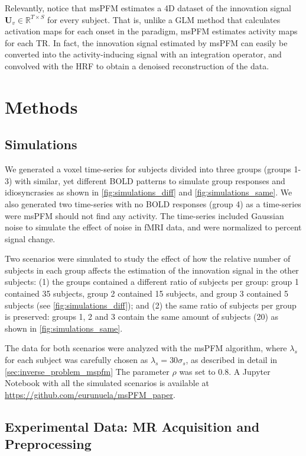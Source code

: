 Relevantly, notice that msPFM estimates a 4D dataset of the innovation signal
$\mathbf{U}_v \in \mathbb{R}^{T \times S}$ for every subject. That is, unlike a
GLM method that calculates activation maps for each onset in the paradigm, msPFM
estimates activity maps for each TR. In fact, the innovation signal estimated by
msPFM can easily be converted into the activity-inducing signal with an
integration operator, and convolved with the HRF to obtain a denoised
reconstruction of the data.

\section{Methods}
\label{sec:multi_subject_methods}

\subsection{Simulations}\label{Data}

We generated a voxel time-series for subjects divided into three groups (groups
1-3) with similar, yet different BOLD patterns to simulate group responses and
idiosyncrasies as shown in \cref{fig:simulations_diff} and
\cref{fig:simulations_same}. We also generated two time-series with no BOLD
responses (group 4) as a time-series were msPFM should not find any activity.
The time-series included Gaussian noise to simulate the effect of noise in fMRI
data, and were normalized to percent signal change.

Two scenarios were simulated to study the effect of how the relative number of
subjects in each group affects the estimation of the innovation signal in the
other subjects: (1) the groups contained a different ratio of subjects per
group: group 1 contained 35 subjects, group 2 contained 15 subjects, and group 3
contained 5 subjects (see \cref{fig:simulations_diff}); and (2) the same ratio
of subjects per group is preserved: groups 1, 2 and 3 contain the same amount of
subjects (20) as shown in \cref{fig:simulations_same}. 

The data for both scenarios were analyzed with the msPFM algorithm, where
$\lambda_s$ for each subject was carefully chosen as $\lambda_s = 30 \sigma_s$,
as described in detail in \cref{sec:inverse_problem_mspfm} The parameter $\rho$
was set to 0.8. A Jupyter Notebook with all the simulated scenarios is available
at \url{https://github.com/eurunuela/msPFM\_paper}.

\subsection{Experimental Data: MR Acquisition and Preprocessing}

